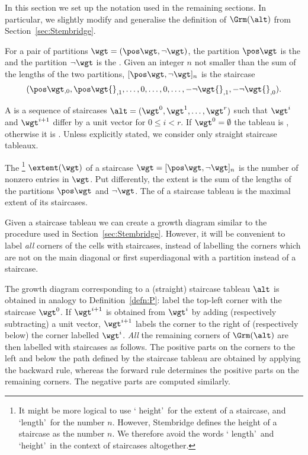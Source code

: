 In this section we set up the notation used in the remaining
sections. In particular, we slightly modify and generalise the
definition of $\Grm(\alt)$ from Section~\ref{sec:Stembridge}.
\begin{defi}
 For a pair of partitions $\wgt=(\pos\wgt,\neg\wgt)$, the partition
 $\pos\wgt$ is the  and the partition $\neg\wgt$
 is the . Given an integer $n$ not smaller than
 the sum of the lengths of the two partitions,
 $[\pos\wgt,\neg\wgt]_n$ is the staircase
 \[
 ({\pos\wgt}{}_{,0},\pos\wgt{}_{,1},\dots,0,\dots,0,
 \dots,-\neg\wgt{}_{,1},-\neg\wgt{}_{,0}).
 \]

 A  is a sequence of staircases
 $\alt=(\wgt^0,\wgt^1,\dots,\wgt^r)$ such that $\wgt^i$ and
 $\wgt^{i+1}$ differ by a unit vector for $0\leq i<r$. If
 $\wgt^0=\emptyset$ the tableau is , otherwise it is
 . Unless explicitly stated, we consider only straight
 staircase tableaux.

 The \footnote{It might be more logical to use \lq
 height\rq\ for the extent of a staircase, and \lq length\rq\ for
 the number $n$. However, Stembridge defines the height of a
 staircase as the number $n$. We therefore avoid the words \lq
 length\rq\ and \lq height\rq\ in the context of staircases
 altogether.} $\extent(\wgt)$ of a staircase
 $\wgt=[\pos\wgt,\neg\wgt]_n$ is the number of nonzero entries in
 $\wgt$. Put differently, the extent is the sum of the lengths of
 the partitions $\pos\wgt$ and $\neg\wgt$. The  of a
 staircase tableau is the maximal extent of its staircases.
\end{defi}

Given a staircase tableau we can create a growth diagram similar to
the procedure used in Section~\ref{sec:Stembridge}. However, it will
be convenient to label \emph{all} corners of the cells with
staircases, instead of labelling the corners which are not on the
main diagonal or first superdiagonal with a partition instead of a
staircase.
\begin{defi}
 The growth diagram \Dfn{$\Grm(\alt)$} corresponding to a (straight)
 staircase tableau $\alt$ is obtained in analogy to
 Definition~\ref{defn:P}: label the top-left corner with the
 staircase $\wgt^0$. If $\wgt^{i+1}$ is obtained from $\wgt^i$ by
 adding (respectively subtracting) a unit vector, $\wgt^{i+1}$
 labels the corner to the right of (respectively below) the corner
 labelled $\wgt^i$. \emph{All} the remaining corners of $\Grm(\alt)$
 are then labelled with staircases as follows. The positive parts
 on the corners to the left and below the path defined by the
 staircase tableau are obtained by applying the backward rule,
 whereas the forward rule determines the positive parts on the
 remaining corners. The negative parts are computed similarly.
\end{defi}
 
